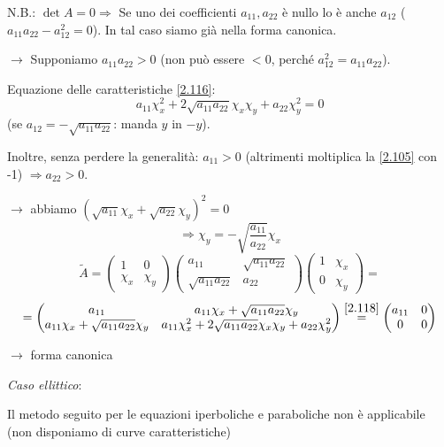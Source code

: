 \documentclass[a4paper,11pt]{report}
\begin{document}
N.B.: $\det A=0 \Rightarrow$ Se uno dei coefficienti $a_{11}, a_{22}$ \`e nullo lo \`e anche $a_{12}$ ($a_{11}a_{22}-a_{12}^2=0$). In tal caso siamo gi\`a nella forma canonica.

$\rightarrow $ Supponiamo $a_{11}a_{22}>0$ (non pu\`o essere $<0$, perch\'e $a_{12}^2 = a_{11}a_{22}$).

Equazione delle caratteristiche \eqref{2.116}:
\[
a_{11}\chi_x^2+2\sqrt{a_{11}a_{22}}\chi_x\chi_y + a_{22}\chi_y^2 =0
\]
(se $a_{12}=-\sqrt{a_{11}a_{22}}$: manda $y$ in $-y$).

Inoltre, senza perdere la generalit\`a: $a_{11}>0$ (altrimenti moltiplica la \eqref{2.105} con -1) $\Rightarrow a_{22}>0$.

$\rightarrow$ abbiamo $(\sqrt{a_{11}}\chi_x + \sqrt{a_{22}}\chi_y)^2=0$
\begin{equation}
\Rightarrow\chi_y = - \sqrt{\frac{a_{11}}{a_{22}}}\chi_x
\label{2.118}
\end{equation}
\[
\tilde{A}=\left(\begin{matrix}
1 & 0\\
\chi_x & \chi_y
\end{matrix}\right)\left(\begin{matrix}
a_{11} & \sqrt{a_{11}a_{22}}\\
\sqrt{a_{11}a_{22}} & a_{22}
\end{matrix}\right)\left(\begin{matrix}
1 & \chi_x \\
0 & \chi_y
\end{matrix}\right)=
\]
\[
=\left(\begin{matrix}
a_{11} & a_{11}\chi_x + \sqrt{a_{11}a_{22}}\chi_y \\
a_{11}\chi_x + \sqrt{a_{11}a_{22}}\chi_y & a_{11}\chi_x^2 + 2\sqrt{a_{11}a_{22}}\chi_x\chi_y + a_{22}\chi_y^2
\end{matrix}\right)\overset{\eqref{2.118}}{=}\left(\begin{matrix}
a_{11} & 0\\
0 & 0
\end{matrix}\right)
\]

$\rightarrow$ forma canonica

\medskip

\emph{Caso ellittico}:

Il metodo seguito per le equazioni iperboliche e paraboliche non \`e applicabile (non disponiamo di curve caratteristiche)
\end{document}
